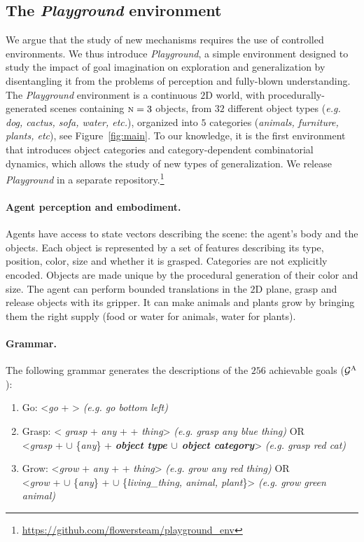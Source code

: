 \subsection{The \textit{Playground} environment}
\label{sec:env}
We argue that the study of new mechanisms requires the use of controlled environments. We thus introduce \textit{Playground}, a simple environment designed to study the impact of goal imagination on exploration and generalization by disentangling it from the problems of perception and fully-blown \NL understanding. The \textit{Playground} environment is a continuous $2$D world, with procedurally-generated scenes containing $\textsc{n}=3$ objects, from $32$ different object types (\textit{e.g. dog, cactus, sofa, water, etc.}), organized into $5$ categories (\textit{animals, furniture, plants, etc}), see Figure~\ref{fig:main}. To our knowledge, it is the first environment that introduces object categories and category-dependent combinatorial dynamics, which allows the study of new types of generalization. We release \textit{Playground} in a separate repository.\footnote{\url{https://github.com/flowersteam/playground\_env}}
%
\paragraph{Agent perception and embodiment.} Agents have access to state vectors describing the scene: the agent's body and the objects. Each object is represented by a set of features describing its type, position, color, size and whether it is grasped. Categories are not explicitly encoded. Objects are made unique by the procedural generation of their color and size. The agent can perform bounded translations in the $2$D plane, grasp and release objects with its gripper. It can make animals and plants grow by bringing them the right supply (food or water for animals, water for plants).  

%
\paragraph{Grammar.}The following grammar generates the descriptions of the $256$ achievable goals ($\mathcal{G}^\text{A}$): 
\begin{enumerate}
    \item 
    Go: <\textit{go} + >  \textit{(e.g. go bottom left) }
    \item 
    Grasp: < \textit{grasp} + \textit{any} +  + \textit{thing}>  \textit{(e.g. grasp any blue thing)} OR \\
    <\textit{grasp} +  $\cup$ \{\textit{any}\}  + \textbf{\textit{object type $\cup$ object category}}> \textit{(e.g. grasp red cat)}
    \item 
    Grow: <\textit{grow} + \textit{any} +  + \textit{thing}> \textit{(e.g. grow any red thing)} OR \\
    <\textit{grow} +  $\cup$ \{\textit{any}\} +  $\cup$ \{\textit{living\_thing, animal, plant}\}> \textit{(e.g. grow green animal)}
\end{enumerate} 

